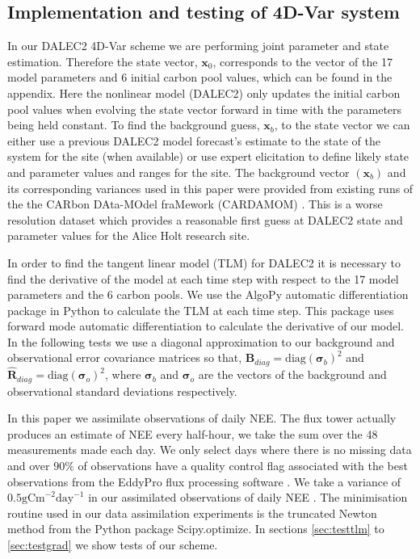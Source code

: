 \documentclass[11pt]{article}
\begin{document}
\subsection{Implementation and testing of 4D-Var system}

In our DALEC2 4D-Var scheme we are performing joint parameter and state estimation. Therefore the state vector, $\textbf{x}_0$, corresponds to the vector of the 17 model parameters and 6 initial carbon pool values, which can be found in the appendix. Here the nonlinear model (DALEC2) only updates the initial carbon pool values when evolving the state vector forward in time with the parameters being held constant. To find the background guess, $\textbf{x}_{b}$, to the state vector we can either use a previous DALEC2 model forecast's estimate to the state of the system for the site (when available) or use expert elicitation to define likely state and parameter values and ranges for the site. The background vector $(\textbf{x}_b)$ and its corresponding variances used in this paper were provided from existing runs of the the CARbon DAta-MOdel fraMework (CARDAMOM) \citep{Exbrayat2015}. This is a worse resolution dataset which provides a reasonable first guess at DALEC2 state and parameter values for the Alice Holt research site.

In order to find the tangent linear model (TLM) for DALEC2 it is necessary to find the derivative of the model at each time step with respect to the 17 model parameters and the 6 carbon pools. We use the AlgoPy automatic differentiation package \citep{Walter2013} in Python to calculate the TLM at each time step. This package uses forward mode automatic differentiation to calculate the derivative of our model. In the following tests we use a diagonal approximation to our background and observational error covariance matrices so that, 
$\textbf{B}_{diag}=\text{diag}(\bm{\sigma}_b)^2$ and $\hat{\textbf{R}}_{diag}=\text{diag}(\bm{\sigma}_o )^2$,
where $\bm{\sigma}_b$ and $\bm{\sigma}_o$ are the vectors of the background and observational standard deviations respectively. 

In this paper we assimilate observations of daily NEE. The flux tower actually produces an estimate of NEE every half-hour, we take the sum over the 48 measurements made each day. We only select days where there is no missing data and over $90\% $ of observations have a quality control flag associated with the best observations from the EddyPro flux processing software \citep{eddypro}. We take a variance of $0.5\text{gCm}^{-2}\text{day}^{-1}$ in our assimilated observations of daily NEE \citep{williams2005improved}. The minimisation routine used in our data assimilation experiments is the truncated Newton method \citep{Nocedal1999} from the Python package Scipy.optimize. In sections \ref{sec:testtlm} to \ref{sec:testgrad} we show tests of our scheme. 
\end{document}
